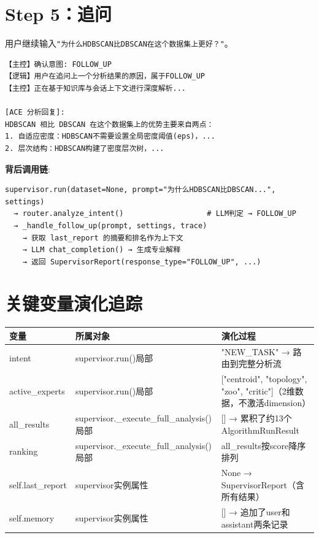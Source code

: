 \documentclass[11pt,a4paper]{ctexbook}
\begin{document}
\section{Step 5：追问}

用户继续输入\verb|"为什么HDBSCAN比DBSCAN在这个数据集上更好？"|。

\begin{verbatim}
【主控】确认意图: FOLLOW_UP
【逻辑】用户在追问上一个分析结果的原因，属于FOLLOW_UP
【主控】正在基于知识库与会话上下文进行深度解析...

[ACE 分析回复]:
HDBSCAN 相比 DBSCAN 在这个数据集上的优势主要来自两点：
1. 自适应密度：HDBSCAN不需要设置全局密度阈值(eps)，...
2. 层次结构：HDBSCAN构建了密度层次树，...
\end{verbatim}

\textbf{背后调用链}:
\begin{verbatim}
supervisor.run(dataset=None, prompt="为什么HDBSCAN比DBSCAN...", settings)
  → router.analyze_intent()                   # LLM判定 → FOLLOW_UP
  → _handle_follow_up(prompt, settings, trace)
    → 获取 last_report 的摘要和排名作为上下文
    → LLM chat_completion() → 生成专业解释
    → 返回 SupervisorReport(response_type="FOLLOW_UP", ...)
\end{verbatim}

\section{关键变量演化追踪}

\begin{longtable}{p{2.5cm} p{2.5cm} p{8cm}}
    \toprule
    \textbf{变量} & \textbf{所属对象} & \textbf{演化过程} \\
    \midrule
    intent & supervisor.run()局部 & "NEW\_TASK" → 路由到完整分析流 \\
    \midrule
    active\_experts & supervisor.run()局部 & ["centroid", "topology", "zoo", "critic"]（2维数据，不激活dimension） \\
    \midrule
    all\_results & supervisor.\_execute\_full\_analysis()局部 & [] → 累积了约13个AlgorithmRunResult \\
    \midrule
    ranking & supervisor.\_execute\_full\_analysis()局部 & all\_results按score降序排列 \\
    \midrule
    self.last\_report & supervisor实例属性 & None → SupervisorReport（含所有结果） \\
    \midrule
    self.memory & supervisor实例属性 & [] → 追加了user和assistant两条记录 \\
    \bottomrule
\end{longtable}
\end{document}
